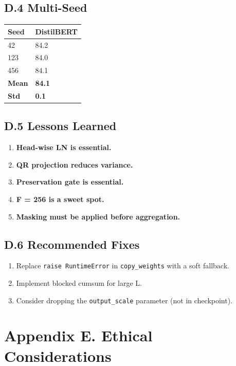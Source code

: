 \subsection{D.4 Multi-Seed}

\begin{table}[H]
\centering
\small
\begin{tabular}{ll}
\toprule
\textbf{Seed} & \textbf{DistilBERT} \\
\midrule
42 & 84.2 \\
123 & 84.0 \\
456 & 84.1 \\
\textbf{Mean} & \textbf{84.1} \\
\textbf{Std} & \textbf{0.1} \\
\bottomrule
\end{tabular}
\end{table}

\subsection{D.5 Lessons Learned}

\begin{enumerate}
\item \textbf{Head-wise LN is essential.}
\item \textbf{QR projection reduces variance.}
\item \textbf{Preservation gate is essential.}
\item \textbf{F = 256 is a sweet spot.}
\item \textbf{Masking must be applied before aggregation.}

\end{enumerate}
\subsection{D.6 Recommended Fixes}

\begin{enumerate}
\item Replace \texttt{raise RuntimeError} in \texttt{copy\_weights} with a soft fallback.
\item Implement blocked cumsum for large L.
\item Consider dropping the \texttt{output\_scale} parameter (not in checkpoint).

\end{enumerate}


\section{Appendix E. Ethical Considerations}

